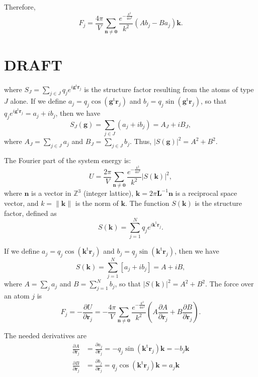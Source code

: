 \documentclass[11pt]{article}
\newcommand{\vt}[1]{\boldsymbol{\mathbf{#1}}}           %
\newcommand{\tr}[1]{#1^\text{t}}                        %
\begin{document}
Therefore,
\begin{equation*}
F_j = \frac{4\pi}{V}\sum_{\vt n \neq \vt 0} \frac{e^{-\frac{k^2}{4\alpha^2}}}{k^2} \left( A b_j - B a_j \right){\vt k}.
\end{equation*}

\section{DRAFT}


where $S_J = \sum_{j \in J} q_j e^{i \tr{\vt g}{\vt r}_j}$ is the structure factor resulting from the atoms of type $J$ alone. If we define $a_j = q_j \cos(\tr{\vt g}{\vt r}_j)$ and $b_j = q_j \sin(\tr{\vt g}{\vt r}_j)$, so that $q_j e^{i \tr{\vt g}{\vt r}_j} = a_j + ib_j$, then we have
\begin{equation*}
S_J(\vt g) = \sum_{j \in J} (a_j + i b_j) = A_J + i B_J,
\end{equation*}
where $A_J = \sum_{j \in J} a_j$ and $B_J = \sum_{j \in J} b_j$. Thus, $|S(\vt g)|^2 = A^2 + B^2$.

The Fourier part of the system energy is:
\begin{equation*}
U = \frac{2\pi}{V}\sum_{\vt n \neq \vt 0} \frac{e^{-\frac{k^2}{4\alpha^2}}}{k^2} |S(\vt k)|^2,
\end{equation*}
where $\vt n$ is a vector in $\mathbb Z^3$ (integer lattice), $\vt k = 2\pi \vt L^{-1}{\vt n}$ is a reciprocal space vector, and $k = \|\vt k\|$ is the norm of $\vt k$. The function $S(\vt k)$ is the structure factor, defined as
\begin{equation*}
S(\vt k) = \sum_{j=1}^N q_j e^{i\tr{\vt k}{\vt r}_j}.
\end{equation*}

If we define $a_j = q_j \cos(\tr{\vt k}{\vt r}_j)$ and $b_j = q_j \sin(\tr{\vt k}{\vt r}_j)$, then we have
\begin{equation*}
S(\vt k) = \sum_{j=1}^N \left[a_j + i b_j\right] = A + i B,
\end{equation*}
where $A = \sum_j a_j$ and $B = \sum_{j=1}^N b_j$, so that $|S(\vt k)|^2 = A^2 + B^2$. The force over an atom $j$ is
\begin{equation*}
F_j = -\frac{\partial U}{\partial \vt r_j} = -\frac{4\pi}{V}\sum_{\vt n \neq \vt 0} \frac{e^{-\frac{k^2}{4\alpha^2}}}{k^2} \left( A \frac{\partial A}{\partial \vt r_j} + B \frac{\partial B}{\partial \vt r_j} \right).
\end{equation*}

The needed derivatives are
\begin{align*}
\frac{\partial A}{\partial \vt r_j} &= \frac{\partial a_j}{\partial \vt r_j} = -q_j \sin(\tr{\vt k}{\vt r}_j){\vt k} = -b_j{\vt k} \\
\frac{\partial B}{\partial \vt r_j} &= \frac{\partial b_j}{\partial \vt r_j} = q_j \cos(\tr{\vt k}{\vt r}_j){\vt k} = a_j{\vt k}
\end{align*}
\end{document}
